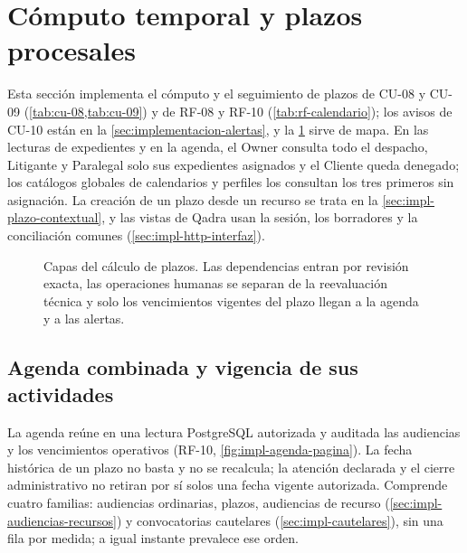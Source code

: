 
\section{Cómputo temporal y plazos procesales}\label{sec:impl-plazos}

Esta sección implementa el cómputo y el seguimiento de plazos de CU-08 y CU-09 (\cref{tab:cu-08,tab:cu-09}) y de RF-08 y RF-10 (\cref{tab:rf-calendario}); los avisos de CU-10 están en la \cref{sec:implementacion-alertas}, y la \cref{fig:impl-capas-plazos} sirve de mapa. En las lecturas de expedientes y en la agenda, el Owner consulta todo el despacho, Litigante y Paralegal solo sus expedientes asignados y el Cliente queda denegado; los catálogos globales de calendarios y perfiles los consultan los tres primeros sin asignación. La creación de un plazo desde un recurso se trata en la \cref{sec:impl-plazo-contextual}, y las vistas de Qadra usan la sesión, los borradores y la conciliación comunes (\cref{sec:impl-http-interfaz}).

\begin{figure}[!htbp]
  \centering
  
  \caption{Capas del cálculo de plazos. Las dependencias entran por revisión exacta, las operaciones humanas se separan de la reevaluación técnica y solo los vencimientos vigentes del plazo llegan a la agenda y a las alertas.}
  \label{fig:impl-capas-plazos}
\end{figure}









\subsection{Agenda combinada y vigencia de sus actividades}\label{sec:implementacion-agenda-combinada}

La agenda reúne en una lectura PostgreSQL autorizada y auditada las audiencias y los vencimientos operativos (RF-10, \cref{fig:impl-agenda-pagina}). La fecha histórica de un plazo no basta y no se recalcula; la atención declarada y el cierre administrativo no retiran por sí solos una fecha vigente autorizada. Comprende cuatro familias: audiencias ordinarias, plazos, audiencias de recurso (\cref{sec:impl-audiencias-recursos}) y convocatorias cautelares (\cref{sec:impl-cautelares}), sin una fila por medida; a igual instante prevalece ese orden.


